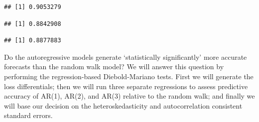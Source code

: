 \documentclass[
  12pt,
  oneside]{book}
\newenvironment{Shaded}{\begin{snugshade}}{\end{snugshade}}
\newcommand{\AttributeTok}[1]{\textcolor[rgb]{0.77,0.63,0.00}{#1}}
\newcommand{\DecValTok}[1]{\textcolor[rgb]{0.00,0.00,0.81}{#1}}
\newcommand{\FunctionTok}[1]{\textcolor[rgb]{0.00,0.00,0.00}{#1}}
\newcommand{\NormalTok}[1]{#1}
\newcommand{\SpecialCharTok}[1]{\textcolor[rgb]{0.00,0.00,0.00}{#1}}
\begin{document}
\begin{Shaded}
\end{Shaded}

\begin{verbatim}
## [1] 0.9053279
\end{verbatim}

\begin{Shaded}
\end{Shaded}

\begin{verbatim}
## [1] 0.8842908
\end{verbatim}

\begin{Shaded}
\end{Shaded}

\begin{verbatim}
## [1] 0.8877883
\end{verbatim}

Do the autoregressive models generate `statistically significantly' more accurate forecasts than the random walk model? We will answer this question by performing the regression-based Diebold-Mariano tests. First we will generate the loss differentials; then we will run three separate regressions to assess predictive accuracy of AR(1), AR(2), and AR(3) relative to the random walk; and finally we will base our decision on the heteroskedasticity and autocorrelation consistent standard errors.
\end{document}
